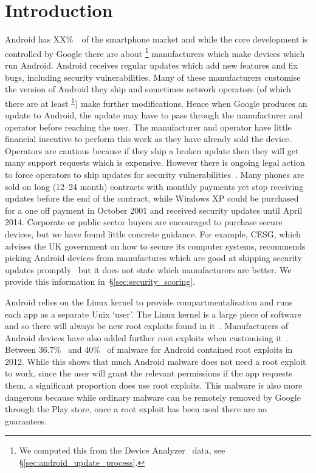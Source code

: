 \documentclass[conference,a4paper,twoside]{IEEEtran}
\let\OldTodo\todo
\renewcommand{\todo}{\OldTodo[inline]}
\newcommand{\todolater}[1]{}%
\newcommand{\da}{Device Analyzer}
\newcommand{\dafoot}{\textsuperscript{\ref{foot:dadata}}}
\newcommand{\percMarketShare}{XX\%~\cite{TODO}}
\begin{document}
\section{Introduction}
Android has \percMarketShare\ of the smartphone market and while the core development is controlled by Google there are about \daNumManufacturers\footnote{\label{foot:dadata}We computed this from the \da~\cite{Wagner2013} data, see \S\ref{sec:android_update_process}.} manufacturers which make devices which run Android.
Android receives regular updates  which add new features and fix bugs, including security vulnerabilities.
Many of these manufacturers customise the version of Android they ship and sometimes network operators (of which there are at least \daNumOperators\dafoot) make further modifications.
Hence when Google produces an update to Android, the update may have to pass through the manufacturer and operator before reaching the user.
The manufacturer and operator have little financial incentive to perform this work as they have already sold the device.
Operators are cautious because if they ship a broken update then they will get many support requests which is expensive.
However there is ongoing legal action to force operators to ship updates for security vulnerabilities~\cite{Soghoian2013}.\todolater{Check on the status of this legal action}
Many phones are sold on long (12--24 month) contracts with monthly payments yet stop receiving updates before the end of the contract,\todolater{Is there a survey of the distribution of contract lengths and phone purchase methods?} while Windows XP could be purchased for a one off payment in October 2001 and received security updates until April 2014.
Corporate or public sector buyers are encouraged to purchase secure devices, but we have found little concrete guidance. For example, CESG, which advises the UK government on how to secure its computer systems, recommends picking Android devices from manufactures which are good at shipping security updates promptly~\cite{CESG2013} but it does not state which manufacturers are better.\todolater{Which other advisory organisations give that advice?}
We provide this information in~\S\ref{sec:security_scoring}.

Android relies on the Linux kernel to provide compartmentalisation and runs each app as a separate Unix `user'.
The Linux kernel is a large piece of software and so there will always be new root exploits found in it~\cite{TODO}.
Manufacturers of Android devices have also added further root exploits when customising it~\cite{Grace2012}.
Between 36.7\%~\cite{Zhou2012b} and 40\%~\cite{Zhou2012a} of malware for Android contained root exploits in 2012.
While this shows that much Android malware does not need a root exploit to work, since the user will grant the relevant permissions if the app requests them, a significant proportion does use root exploits.
This malware is also more dangerous because while ordinary malware can be remotely removed by Google through the Play store, once a root exploit has been used there are no guarantees.
\end{document}
